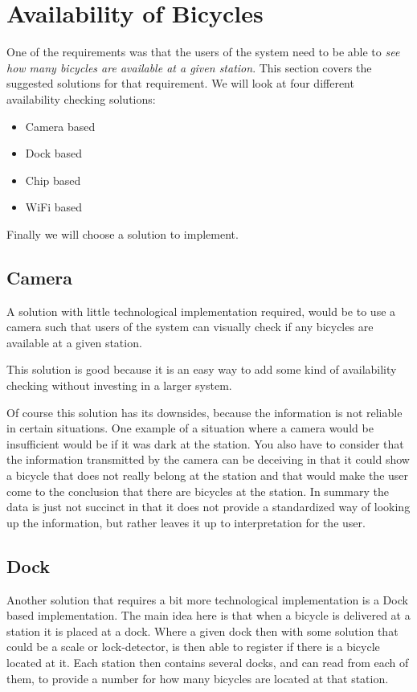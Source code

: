 \section{Availability of Bicycles}\label{sec:availability}
One of the requirements was that the users of the system need to be able to \textit{see how many bicycles are available at a given station}.
This section covers the suggested solutions for that requirement.
We will look at four different availability checking solutions:

\begin{itemize}
\item Camera based
\item Dock based
\item Chip based
\item WiFi based
\end{itemize} 

Finally we will choose a solution to implement.

\subsection{Camera}
A solution with little technological implementation required, would be to use a camera such that users of the system can visually check if any bicycles are available at a given station. 

This solution is good because it is an easy way to add some kind of availability checking without investing in a larger system.

Of course this solution has its downsides, because the information is not reliable in certain situations. 
One example of a situation where a camera would be insufficient would be if it was dark at the station.
You also have to consider that the information transmitted by the camera can be deceiving in that it could show a bicycle that does not really belong at the station and that would make the user come to the conclusion that there are bicycles at the station.
In summary the data is just not succinct in that it does not provide a standardized way of looking up the information, but rather leaves it up to interpretation for the user.

\subsection{Dock}
Another solution that requires a bit more technological implementation is a Dock based implementation.
The main idea here is that when a bicycle is delivered at a station it is placed at a dock.
Where a given dock then with some solution that could be a scale or lock-detector, is then able to register if there is a bicycle located at it.
Each station then contains several docks, and can read from each of them, to provide a number for how many bicycles are located at that station. 

